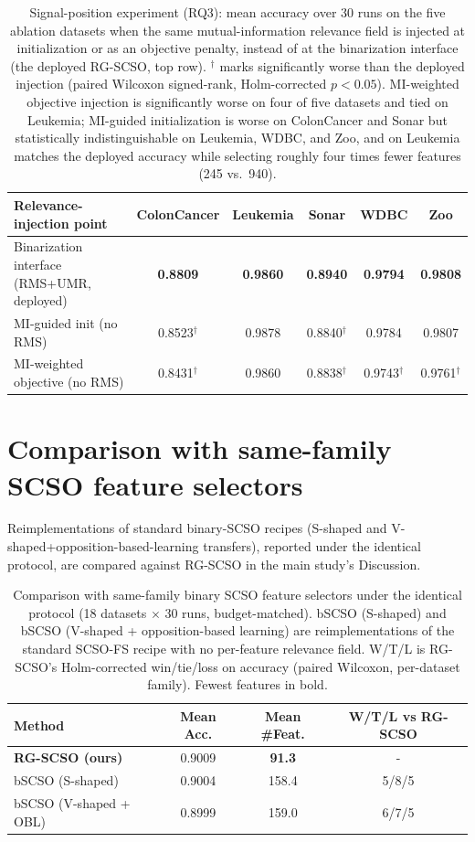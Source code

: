 \documentclass[9pt]{article}
\begin{document}
\begin{table}[t]
\centering
\caption{Signal-position experiment (RQ3): mean accuracy over 30 runs on the five ablation datasets when the same mutual-information relevance field is injected at initialization or as an objective penalty, instead of at the binarization interface (the deployed RG-SCSO, top row). $^\dagger$ marks significantly worse than the deployed injection (paired Wilcoxon signed-rank, Holm-corrected $p<0.05$). MI-weighted objective injection is significantly worse on four of five datasets and tied on Leukemia; MI-guided initialization is worse on ColonCancer and Sonar but statistically indistinguishable on Leukemia, WDBC, and Zoo, and on Leukemia matches the deployed accuracy while selecting roughly four times fewer features (245 vs.\ 940).}
\label{tab:sigpos}
\footnotesize
\begin{tabular}{lccccc}
\toprule
Relevance-injection point & ColonCancer & Leukemia & Sonar & WDBC & Zoo \\
\midrule
Binarization interface (RMS+UMR, deployed) & \textbf{0.8809} & \textbf{0.9860} & \textbf{0.8940} & \textbf{0.9794} & \textbf{0.9808} \\
MI-guided init (no RMS) & 0.8523$^\dagger$ & 0.9878 & 0.8840$^\dagger$ & 0.9784 & 0.9807 \\
MI-weighted objective (no RMS) & 0.8431$^\dagger$ & 0.9860 & 0.8838$^\dagger$ & 0.9743$^\dagger$ & 0.9761$^\dagger$ \\
\bottomrule
\end{tabular}
\end{table}


\FloatBarrier
\section{Comparison with same-family SCSO feature selectors}
Reimplementations of standard binary-SCSO recipes (S-shaped and
V-shaped+opposition-based-learning transfers), reported under the identical
protocol, are compared against RG-SCSO in the main study's Discussion.

\begin{table}[t]
\centering
\caption{Comparison with same-family binary SCSO feature selectors under the identical protocol (18 datasets $\times$ 30 runs, budget-matched). bSCSO (S-shaped) and bSCSO (V-shaped + opposition-based learning) are reimplementations of the standard SCSO-FS recipe with no per-feature relevance field. W/T/L is RG-SCSO's Holm-corrected win/tie/loss on accuracy (paired Wilcoxon, per-dataset family). Fewest features in bold.}
\label{tab:scsofamily}
\footnotesize
\begin{tabular}{lccc}
\toprule
Method & Mean Acc. & Mean \#Feat. & W/T/L vs RG-SCSO \\
\midrule
\textbf{RG-SCSO (ours)} & 0.9009 & \textbf{91.3} & - \\
bSCSO (S-shaped) & 0.9004 & 158.4 & 5/8/5 \\
bSCSO (V-shaped + OBL) & 0.8999 & 159.0 & 6/7/5 \\
\bottomrule
\end{tabular}
\end{table}
\end{document}
